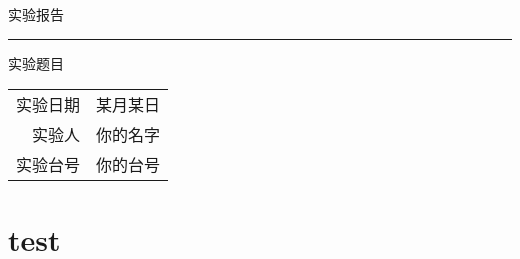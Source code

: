 \documentclass{article}
\begin{document}
\begin{titlepage}   
    \vspace*{\fill} %
    \begin{center}
        \huge{实验报告}
        \rule{\linewidth}{0.01cm}


        \vspace{0.1cm}

    
        \large{实验题目}


        \vspace{2cm}%

        \bigskip

        \vspace{2cm}%

        \vspace{2cm}%
        \begin{tabular}{|r l|}
            \hline
            实验日期 & 某月某日\\
            实验人 & 你的名字\\
            实验台号 & 你的台号\\
            \hline
        \end{tabular}
    \end{center}
\end{titlepage}
\tableofcontents
\section{test}
\end{document}
